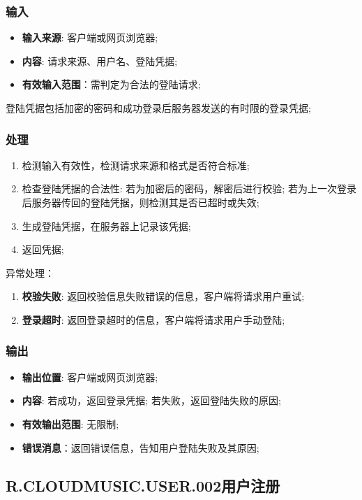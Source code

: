 \begin{enumerate}
\subsubsection{输入}
	\begin{itemize}
		\item \textbf{输入来源}: 客户端或网页浏览器;
		\item \textbf{内容}: 请求来源、用户名、登陆凭据;
		\item \textbf{有效输入范围}：需判定为合法的登陆请求;
	\end{itemize}
	\noindent 登陆凭据包括加密的密码和成功登录后服务器发送的有时限的登录凭据;
\subsubsection{处理}
	\begin{enumerate}
		\item 检测输入有效性，检测请求来源和格式是否符合标准;
		\item 检查登陆凭据的合法性: 若为加密后的密码，解密后进行校验;
      若为上一次登录后服务器传回的登陆凭据，则检测其是否已超时或失效;
		\item 生成登陆凭据，在服务器上记录该凭据;
		\item 返回凭据;
	\end{enumerate}
	\noindent 异常处理：
	\begin{enumerate}
		\item \textbf{校验失败}: 返回校验信息失败错误的信息，客户端将请求用户重试;
		\item \textbf{登录超时}: 返回登录超时的信息，客户端将请求用户手动登陆;
	\end{enumerate}
\subsubsection{输出}
\begin{itemize}
	\item \textbf{输出位置}: 客户端或网页浏览器;
	\item \textbf{内容}: 若成功，返回登录凭据; 若失败，返回登陆失败的原因;
	\item \textbf{有效输出范围}: 无限制;
	\item \textbf{错误消息}：返回错误信息，告知用户登陆失败及其原因;
\end{itemize}

\subsection{R.CLOUDMUSIC.USER.002用户注册}

\end{enumerate}
